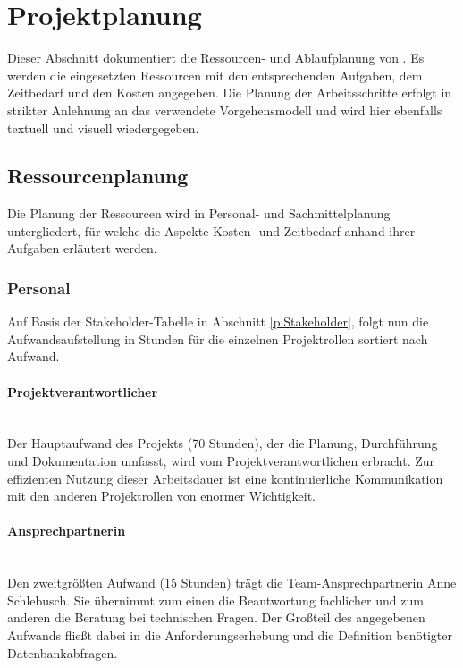 \section{Projektplanung} 
\label{sec:Projektplanung}
Dieser Abschnitt dokumentiert die Ressourcen- und Ablaufplanung von \projektName. Es werden die eingesetzten Ressourcen mit den entsprechenden Aufgaben, dem Zeitbedarf und den Kosten angegeben. Die Planung der Arbeitsschritte erfolgt in strikter Anlehnung an das verwendete Vorgehensmodell und wird hier ebenfalls textuell und visuell wiedergegeben.

\subsection{Ressourcenplanung}
\label{sec:Ressourcenplanung}
Die Planung der Ressourcen wird in Personal- und Sachmittelplanung untergliedert, für welche die Aspekte Kosten- und Zeitbedarf anhand ihrer Aufgaben erläutert werden.

\subsubsection{Personal}
\label{sec:Personal}
Auf Basis der Stakeholder-Tabelle in Abschnitt \ref{p:Stakeholder}, folgt nun die Aufwandsaufstellung in Stunden für die einzelnen Projektrollen sortiert nach Aufwand.

\paragraph{Projektverantwortlicher} ~\\
\label{p:Projektverantwortlicher}
Der Hauptaufwand des Projekts (70 Stunden), der \ua die Planung, Durchführung und Dokumentation umfasst, wird vom Projektverantwortlichen \autorName\xspace erbracht. Zur effizienten Nutzung dieser Arbeitsdauer ist eine kontinuierliche Kommunikation mit den anderen Projektrollen von enormer Wichtigkeit.

\paragraph{Ansprechpartnerin} ~\\
\label{p:Ansprechpartnerin}
Den zweitgrößten Aufwand (15 Stunden) trägt die Team-Ansprechpartnerin Anne Schlebusch. Sie übernimmt zum einen die Beantwortung fachlicher und zum anderen die Beratung bei technischen Fragen. Der Großteil des angegebenen Aufwands fließt dabei in die Anforderungserhebung und die Definition benötigter Datenbankabfragen.

